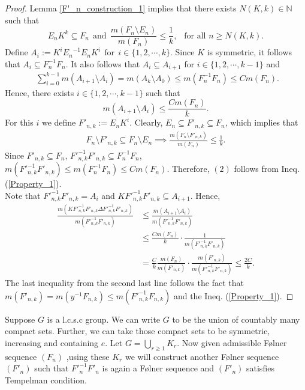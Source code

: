 \documentclass[11pt]{amsart}
\theoremstyle{definition}
\theoremstyle{myremark}
\numberwithin{equation}{section}
\def\N{\mathbb N}
\begin{document}
\begin{proof}
 Lemma \ref{F'_n_construction_1} implies that  there exists $ N(K,k) \in \N$ such that 
 $$E_nK^k \subseteq F_n ~~\text{and}~~ \frac{m(F_n\setminus E_n)}{m(F_n)} \leq \frac{1}{k},  ~~\text{ for all } n\geq N(K,k).$$ 
 Define $A_i:= K^i{E_n}^{-1}E_nK^i~~\text{for}~~ i\in \{1,2,\cdots,k\}$. Since $K$ is symmetric, it follows that   $A_i \subseteq F_n^{-1}F_n$. 
It also follows that  $A_i \subseteq A_{i+1}$  for $  i\in \{1,2,\cdots, k-1\}$  and 
 \begin{align}\label{Inequality_of_Tempelman_condition}
     ~~ \sum_{i=0}^{k-1}m(A_{i+1}\setminus A_i)=m(A_k \setminus A_0) \leq m(F_n^{-1}F_n) \leq Cm(F_n).
 \end{align}
Hence,  there exists $ i \in \{1,2,\cdots,k-1\} $ such that 
 $$ 
 m(A_{i+1}\setminus A_i)\leq \frac{Cm(F_n)}{k}.
 $$ 
 For this $i$ we define $F'_{n,k}:= E_nK^i$. Clearly, $E_n \subseteq F'_{n,k} \subseteq F_n$, which implies that 
 \begin{align}\label{Property_1}
     F_n\setminus F'_{n,k} \subseteq F_n\setminus E_n \implies \frac{m(F_n \setminus F'_{n,k})}{m(F_n)} \leq \frac{1}{k}.
 \end{align}
 Since $F'_{n,k} \subseteq F_n$, ${F'^{-1}_{n,k}}F'_{n,k} \subseteq {F^{-1}_n}F_n$, $m({F'^{-1}_{n,k}}F'_{n,k}) \leq m({F^{-1}_n}F_n) \leq Cm(F_n).$
 Therefore, $(2)$ follows from Ineq. (\ref{Property_1}).\\
 Note that ${F'^{-1}_{n,k}}F'_{n,k} = A_i$ and ${KF'^{-1}_{n,k}}F'_{n,k} \subseteq A_{i+1}.$
 Hence,
 \begin{align*}
\frac{m(K{F'^{-1}_{n,k}}F'_{n,k} \Delta {F'^{-1}_{n,k}}F'_{n,k})}{m({F'^{-1}_{n,k}}F'_{n,k})} &\leq \frac{m(A_{i+1}\setminus A_i)}{m({F'^{-1}_{n,k}}F'_{n,k})}\\ 
&\leq \frac{Cm(F_n)}{k}\cdot \frac{1}{m({F'^{-1}_{n,k}}F'_{n,k})}\\
&=\frac{C}{k}\frac{m(F_n)}{m(F'_{n,k})}\cdot \frac{m(F'_{n,k})}{m({F'^{-1}_{n,k}}F'_{n,k})}
\leq \frac{2C}{k}.
 \end{align*}
 The last inequality from the second last line follows the fact that $m(F'_{n,k})=m(y^{-1}F_{n,k})\leq m({F'^{-1}_{n,k}}F_{n,k})$ and the Ineq. (\ref{Property_1}).
\end{proof}
Suppose $G$ is a l.c.s.c group. We can write $G$ to be the union of countably many compact sets. Further, we can take those compact sets to be symmetric, increasing and containing $e$. Let $G=\displaystyle\bigcup_{r\geq1} K_r$. Now given admissible F\o lner sequence $(F_n)$ ,using these $K_r$ we will construct another F\o lner sequence $(F'_n)$ such that ${F'^{-1}_n}F'_n$ is again a F\o lner sequence and $(F'_n)$ satisfies Tempelman condition. 
\end{document}
